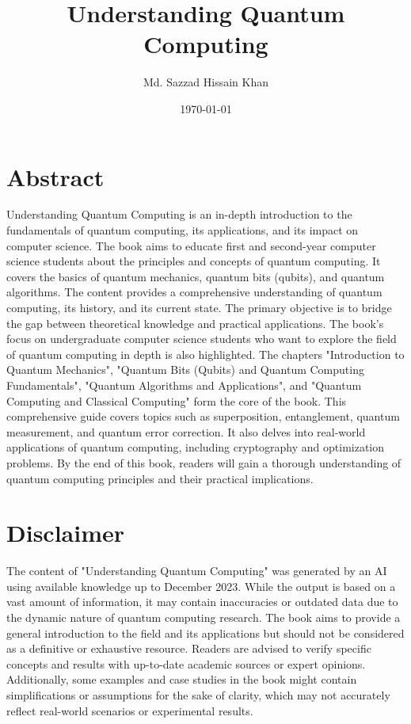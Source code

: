 \documentclass{report}%
\title{Understanding Quantum Computing}%
\author{Md. Sazzad Hissain Khan}%
\date{\today}%
\begin{document}
%
\normalsize%
\maketitle%
\tableofcontents%
\newpage%
\section*{Abstract}

Understanding Quantum Computing is an in-depth introduction to the fundamentals of quantum computing, its applications, and its impact on computer science. The book aims to educate first and second-year computer science students about the principles and concepts of quantum computing. It covers the basics of quantum mechanics, quantum bits (qubits), and quantum algorithms. The content provides a comprehensive understanding of quantum computing, its history, and its current state. The primary objective is to bridge the gap between theoretical knowledge and practical applications. The book's focus on undergraduate computer science students who want to explore the field of quantum computing in depth is also highlighted. The chapters "Introduction to Quantum Mechanics", "Quantum Bits (Qubits) and Quantum Computing Fundamentals", "Quantum Algorithms and Applications", and "Quantum Computing and Classical Computing" form the core of the book. This comprehensive guide covers topics such as superposition, entanglement, quantum measurement, and quantum error correction. It also delves into real-world applications of quantum computing, including cryptography and optimization problems. By the end of this book, readers will gain a thorough understanding of quantum computing principles and their practical implications.

\section*{Disclaimer}

The content of "Understanding Quantum Computing" was generated by an AI using available knowledge up to December 2023. While the output is based on a vast amount of information, it may contain inaccuracies or outdated data due to the dynamic nature of quantum computing research. The book aims to provide a general introduction to the field and its applications but should not be considered as a definitive or exhaustive resource. Readers are advised to verify specific concepts and results with up-to-date academic sources or expert opinions. Additionally, some examples and case studies in the book might contain simplifications or assumptions for the sake of clarity, which may not accurately reflect real-world scenarios or experimental results.%
%
\end{document}
